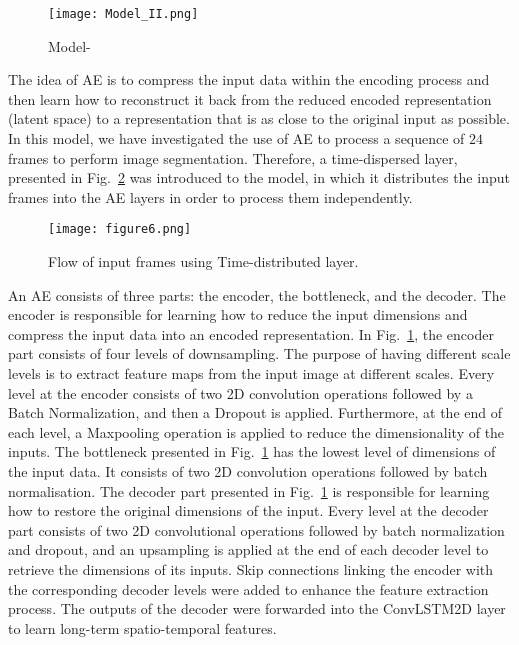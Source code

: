 \begin{sloppypar}
	\begin{figure} [ht!]
			\centering
			\texttt{[image: Model\_II.png]}
			\caption{Model-} %
			\label{fig:AE_convlstm}
	\end{figure} 
	
	The idea of AE is to compress the input data within the encoding process and then learn how to reconstruct it back from the reduced encoded representation (latent space) to a representation that is as close to the original input as possible. 
	In this model, we have investigated the use of AE to process a sequence of \(24\) frames to perform image segmentation.
	Therefore, a time-dispersed layer, presented in Fig.~\ref{fig:TD} was introduced to the model, in which it distributes the input frames into the AE layers in order to process them independently.
	\begin{figure}[!ht]
		\centering
		\texttt{[image: figure6.png]}
		\caption{Flow of input frames using Time-distributed layer.}
		\label{fig:TD}
	\end{figure}
	
	An AE consists of three parts: the encoder, the bottleneck, and the decoder.
	The encoder is responsible for learning how to reduce the input dimensions and compress the input data into an encoded representation.
	In Fig.~\ref{fig:AE_convlstm}, the encoder part consists of four levels of downsampling. 
	The purpose of having different scale levels is to extract feature maps from the input image at different scales.
	Every level at the encoder consists of two 2D convolution operations followed by a Batch Normalization, and then a Dropout is applied.
	Furthermore, at the end of each level, a Maxpooling operation is applied to reduce the dimensionality of the inputs. 
	The bottleneck presented in Fig.~\ref{fig:AE_convlstm} has the lowest level of dimensions of the input data.
	It consists of two 2D convolution operations followed by batch normalisation.
	The decoder part presented in Fig.~\ref{fig:AE_convlstm} is responsible for learning how to restore the original dimensions of the input.
	Every level at the decoder part consists of two 2D convolutional operations followed by batch normalization and dropout, and an upsampling is applied at the end of each decoder level to retrieve the dimensions of its inputs.
	Skip connections linking the encoder with the corresponding decoder levels were added to enhance the feature extraction process.
	The outputs of the decoder were forwarded into the ConvLSTM2D layer to learn long-term spatio-temporal features.
	

\end{sloppypar}
